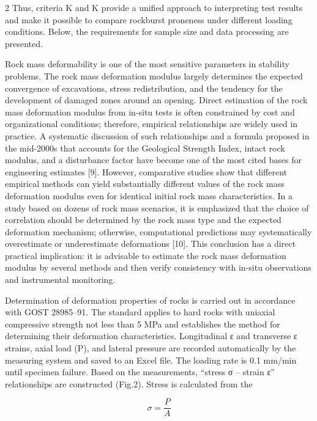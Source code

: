 \begin{multicols}{2}
Thus, criteria K and K provide a
unified approach to interpreting test results and make it possible to
compare rockburst proneness under different loading conditions. Below,
the requirements for sample size and data processing are presented.

Rock mass deformability is one of the most sensitive parameters in
stability problems. The rock mass deformation modulus largely determines
the expected convergence of excavations, stress redistribution, and the
tendency for the development of damaged zones around an opening. Direct
estimation of the rock mass deformation modulus from in-situ tests is
often constrained by cost and organizational conditions; therefore,
empirical relationships are widely used in practice. A systematic
discussion of such relationships and a formula proposed in the mid-2000s
that accounts for the Geological Strength Index, intact rock modulus,
and a disturbance factor have become one of the most cited bases for
engineering estimates {[}9{]}. However, comparative studies show that
different empirical methods can yield substantially different values of
the rock mass deformation modulus even for identical initial rock mass
characteristics. In a study based on dozens of rock mass scenarios, it
is emphasized that the choice of correlation should be determined by the
rock mass type and the expected deformation mechanism; otherwise,
computational predictions may systematically overestimate or
underestimate deformations {[}10{]}. This conclusion has a direct
practical implication: it is advisable to estimate the rock mass
deformation modulus by several methods and then verify consistency with
in-situ observations and instrumental monitoring.

Determination of deformation properties of rocks is carried out in
accordance with GOST 28985--91. The standard applies to hard rocks with
uniaxial compressive strength not less than 5 MPa and establishes the
method for determining their deformation characteristics. Longitudinal
ε and transverse ε strains, axial load
(P), and lateral pressure are recorded automatically by the measuring
system and saved to an Excel file. The loading rate is 0.1 mm/min until
specimen failure. Based on the measurements, ``stress σ -- strain ε''
relationships are constructed (Fig.2). Stress is calculated from the

\begin{equation*}
\sigma = \frac{P}{A}
\end{equation*}


\end{multicols}
